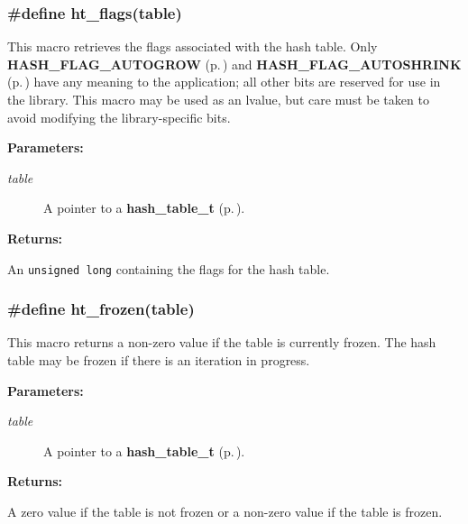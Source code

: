 \subsubsection{\setlength{\rightskip}{0pt plus 5cm}\#define ht\_\-flags(table)}\label{group__dbprim__hash_a20}




 This macro retrieves the flags associated with the hash table. Only {\bf HASH\_\-FLAG\_\-AUTOGROW} {\rm (p.\,\pageref{group__dbprim__hash_a16})} and {\bf HASH\_\-FLAG\_\-AUTOSHRINK} {\rm (p.\,\pageref{group__dbprim__hash_a17})} have any meaning to the application; all other bits are reserved for use in the library. This macro may be used as an lvalue, but care must be taken to avoid modifying the library-specific bits.\begin{Desc}
\item[{\bf Parameters: }]\par
\begin{description}
\item[
{\em table}]A pointer to a {\bf hash\_\-table\_\-t} {\rm (p.\,\pageref{group__dbprim__hash_a0})}.

\end{description}
\end{Desc}
\begin{Desc}
\item[{\bf Returns: }]\par
An {\tt unsigned long} containing the flags for the hash table. \end{Desc}
\subsubsection{\setlength{\rightskip}{0pt plus 5cm}\#define ht\_\-frozen(table)}\label{group__dbprim__hash_a21}




 This macro returns a non-zero value if the table is currently frozen. The hash table may be frozen if there is an iteration in progress.\begin{Desc}
\item[{\bf Parameters: }]\par
\begin{description}
\item[
{\em table}]A pointer to a {\bf hash\_\-table\_\-t} {\rm (p.\,\pageref{group__dbprim__hash_a0})}.

\end{description}
\end{Desc}
\begin{Desc}
\item[{\bf Returns: }]\par
A zero value if the table is not frozen or a non-zero value if the table is frozen. \end{Desc}
